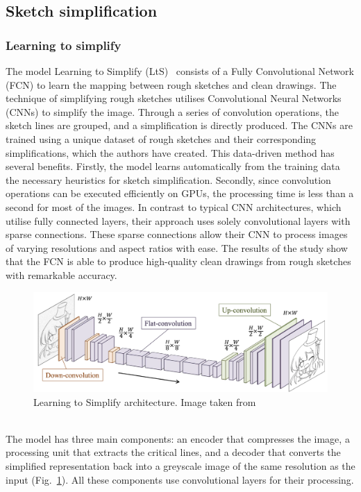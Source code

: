 \subsection{Sketch simplification}
\subsubsection{Learning to simplify}
\label{sec:learning to simplify}
The model Learning to Simplify (LtS)~\cite{SketchSimplify} consists of a Fully Convolutional Network (FCN) to learn the mapping between rough sketches and clean drawings. The technique of simplifying rough sketches utilises Convolutional Neural Networks (CNNs) to simplify the image. Through a series of convolution operations, the sketch lines are grouped, and a simplification is directly produced. The CNNs are trained using a unique dataset of rough sketches and their corresponding simplifications, which the authors have created. This data-driven method has several benefits. Firstly, the model learns automatically from the training data the necessary heuristics for sketch simplification. Secondly, since convolution operations can be executed efficiently on GPUs, the processing time is less than a second for most of the images. In contrast to typical CNN architectures, which utilise fully connected layers, their approach uses solely convolutional layers with sparse connections. These sparse connections allow their CNN to process images of varying resolutions and aspect ratios with ease. The results of the study show that the FCN is able to produce high-quality clean drawings from rough sketches with remarkable accuracy.
\begin{figure}[h!]
\centering
  \includegraphics[scale=0.3]{figures/learnToSimplifyArchitecture.png}
  \caption{Learning to Simplify architecture. Image taken from~\cite{SketchSimplify}}
  \label{fig:Learning to Simplify architecture}
\end{figure}
\\
The model has three main components: an encoder that compresses the image, a processing unit that extracts the critical lines, and a decoder that converts the simplified representation back into a greyscale image of the same resolution as the input (Fig.~\ref{fig:Learning to Simplify architecture}). All these components use convolutional layers for their processing.

